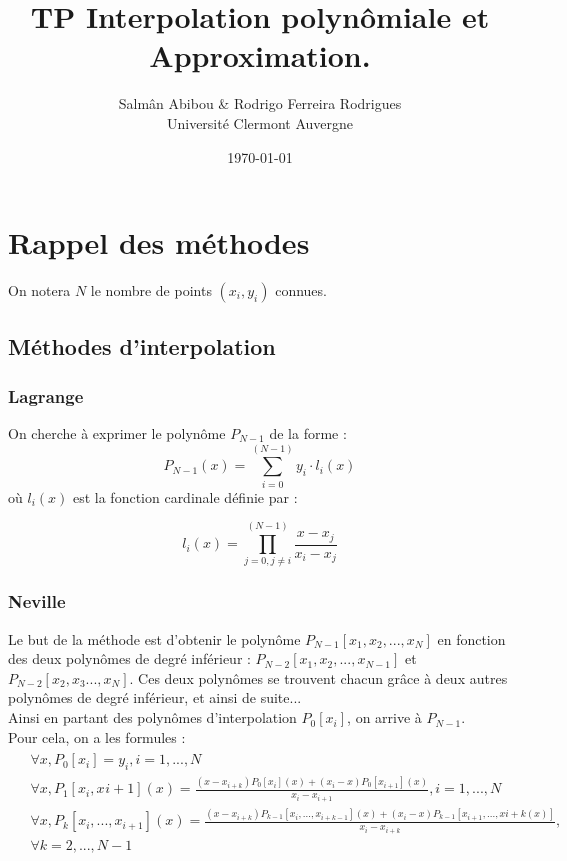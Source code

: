 \documentclass[12pt,french,titlepage]{article}
\title{TP Interpolation polynômiale et Approximation.}
\author{Salmân Abibou \& Rodrigo Ferreira Rodrigues \\
Université Clermont Auvergne\\}
\date{\today}
\begin{document}
	\maketitle


	\tableofcontents
	\newpage
	
	\section{Rappel des méthodes}
	On notera $N$ le nombre de points $(x_i,y_i)$ connues.
	\subsection{Méthodes d'interpolation}
	
	\subsubsection{Lagrange}

	On cherche à exprimer le polynôme $P_{N-1}$ de la forme :
	\begin{equation}
	P_{N-1}(x) = \sum_{i=0}^{(N-1)}y_i\cdot l_i(x) \label{lagrange}
	\end{equation}
	où $l_i(x)$ est la fonction cardinale définie par :
	
	\begin{equation}
	l_i(x) = \prod_{j=0,j\neq i}^{(N-1)}\frac{x - x_j}{x_i - x_j} \label{cardinale}
	\end{equation}
	
	\subsubsection{Neville}
	
	Le but de la méthode est d'obtenir le polynôme $P_{N-1}[x_1,x_2,... ,x_N]$ en fonction des deux polynômes de degré inférieur : $P_{N-2}[x_1,x_2,... ,x_{N-1}]$ et $P_{N-2}[x_2,x_3... ,x_{N}]$. Ces deux polynômes se trouvent chacun grâce à deux autres polynômes de degré inférieur, et ainsi de suite...\\
	Ainsi en partant des polynômes d'interpolation $P_0[x_i]$, on arrive à $P_{N-1}$.\\
	Pour cela, on a les formules :\\
	\begin{align}
		\begin{split}
	&\forall x,P_0[x_i]=y_i,i=1,...,N\\
	&\forall x,P_1[x_i,x_{}i+1](x)=\frac{(x-x_{i+k})P_{0}[x_i](x)+(x_i-x)P_{0}[x_{i+1}](x)}{x_i-x_{i+1}},i=1,...,N\\
	&\forall x,P_k[x_i,...,x_{i+1}](x)=\frac{(x-x_{i+k})P_{k-1}[x_i,...,x_{i+k-1}](x)+(x_i-x)P_{k-1}[x_{i+1},...,x{i+k}(x)]}{x_i-x_{i+k}},\\ \label{neville}
	&\forall k=2,...,N-1
		\end{split}
	\end{align}
	
\end{document}
